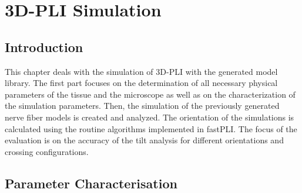 \cleardoublepage
\setcounter{chapter}{8}
\chapter{\acs{3D-PLI} Simulation}
\label{cha:simulation_analysis}
%
\section{Introduction}
%
This chapter deals with the simulation of \ac{3D-PLI} with the generated model library.
The first part focuses on the determination of all necessary physical parameters of the tissue and the microscope as well as on the characterization of the simulation parameters.
Then, the simulation of the previously generated nerve fiber models is created and analyzed.
The orientation of the simulations is calculated using the routine algorithms implemented in \ac{fastPLI}.
The focus of the evaluation is on the accuracy of the tilt analysis for different orientations and crossing configurations.
%
%
%
\section{Parameter Characterisation}\label{sec:sim_choose_parameters}
%
